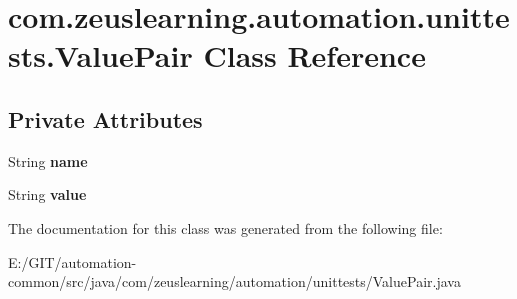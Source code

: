 \hypertarget{classcom_1_1zeuslearning_1_1automation_1_1unittests_1_1ValuePair}{}\section{com.\+zeuslearning.\+automation.\+unittests.\+Value\+Pair Class Reference}
\label{classcom_1_1zeuslearning_1_1automation_1_1unittests_1_1ValuePair}
\subsection*{Private Attributes}
\begin{DoxyCompactItemize}
\item 
\hypertarget{classcom_1_1zeuslearning_1_1automation_1_1unittests_1_1ValuePair_a18c0fdc93ef8822f1f442489f09cfa2c}{}\label{classcom_1_1zeuslearning_1_1automation_1_1unittests_1_1ValuePair_a18c0fdc93ef8822f1f442489f09cfa2c} 
String {\bfseries name}
\item 
\hypertarget{classcom_1_1zeuslearning_1_1automation_1_1unittests_1_1ValuePair_a8226998d8f6b9e5356dcc6d7a5289327}{}\label{classcom_1_1zeuslearning_1_1automation_1_1unittests_1_1ValuePair_a8226998d8f6b9e5356dcc6d7a5289327} 
String {\bfseries value}
\end{DoxyCompactItemize}


The documentation for this class was generated from the following file\+:\begin{DoxyCompactItemize}
\item 
E\+:/\+G\+I\+T/automation-\/common/src/java/com/zeuslearning/automation/unittests/Value\+Pair.\+java\end{DoxyCompactItemize}
